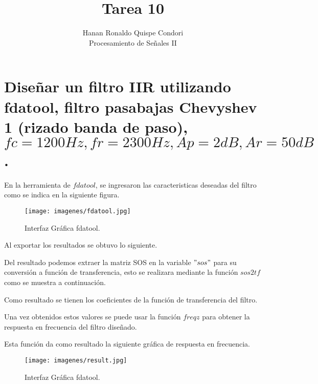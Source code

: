 \documentclass[12pt]{article}
\begin{document}
\title{Tarea 10}
\author{Hanan Ronaldo Quispe Condori\\ %
Procesamiento de Señales II}

\maketitle
\section{Diseñar un filtro IIR utilizando fdatool, filtro pasabajas Chevyshev 1 (rizado banda de paso), $fc=1200Hz,fr=2300Hz,Ap=2dB,Ar=50dB$.}

En la herramienta de $fdatool$, se ingresaron las caracteristicas deseadas del filtro como se indica en la siguiente figura.
\begin{figure}[h]
    \centering
    \texttt{[image: imagenes/fdatool.jpg]}
    \caption{Interfaz Gráfica fdatool.}
    \label{fig:fda}
\end{figure}

Al exportar los resultados se obtuvo lo siguiente.


Del resultado podemos extraer la matriz SOS en la variable $"sos"$ para su conversión a función de transferencia, esto se realizara mediante la función $sos2tf$  como se muestra a continuación.



Como resultado se tienen los coeficientes de la función de transferencia del filtro.



Una vez obtenidos estos valores se puede usar la función $freqz$ para obtener la respuesta en frecuencia del filtro diseñado.



Esta función da como resultado la siguiente gráfica de respuesta en frecuencia.

\begin{figure}[h]
    \centering
    \texttt{[image: imagenes/result.jpg]}
    \caption{Interfaz Gráfica fdatool.}
    \label{fig:fda}
\end{figure}
\end{document}

